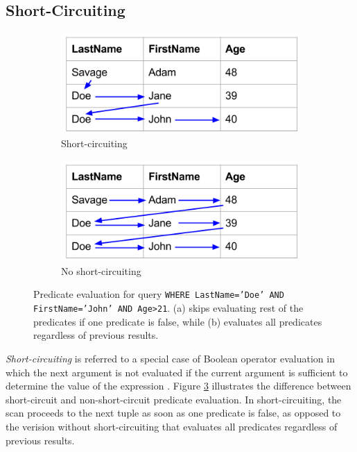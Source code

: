 \subsection{Short-Circuiting}
\label{sub:Short-Circuiting}
\begin{figure}
  \centering
  \begin{subfigure}{0.45\textwidth}
    \includegraphics[width=\textwidth]{img/short-circuiting-1.png}
    \caption{Short-circuiting}
    \label{fig:short-circuiting-1} 
  \end{subfigure}
  \begin{subfigure}{0.45\textwidth}
    \includegraphics[width=\textwidth]{img/short-circuiting-2.png}
    \caption{No short-circuiting}
    \label{fig:short-circuiting-2} 
  \end{subfigure}
  \caption{Predicate evaluation for query \texttt{WHERE LastName='Doe' AND FirstName='John' AND Age>21}. (a) skips evaluating rest of the predicates if one predicate is false, while (b) evaluates all predicates regardless of previous results.}
  \label{fig:short-circuiting} 
\end{figure}
\textit{Short-circuiting} is referred to a special case of Boolean operator evaluation in which the next argument is not evaluated if the current argument is sufficient to determine the value of the expression \cite{Wikipedia_contributors2015-rk}. Figure \ref{fig:short-circuiting} illustrates the difference between short-circuit and non-short-circuit predicate evaluation. In short-circuiting, the scan proceeds to the next tuple as soon as one predicate is false, as opposed to the verision without short-circuiting that evaluates all predicates regardless of previous results.


